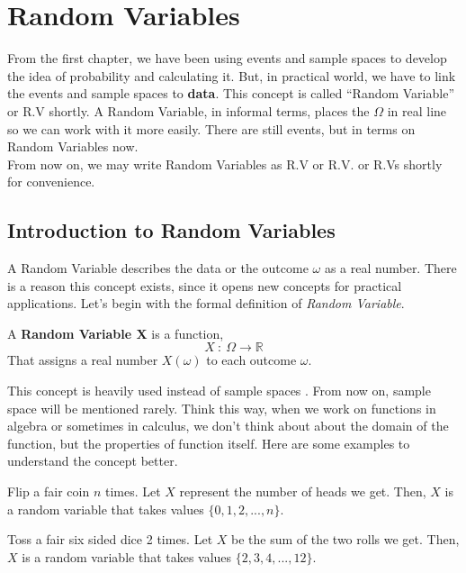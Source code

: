 \chapter{Random Variables}
From the first chapter, we have been using events and sample spaces to develop the idea of probability and calculating it. But, in practical world,  we have to link the events and sample spaces to \textbf{data}. This concept is called ``Random Variable'' or R.V shortly.
A Random Variable, in informal terms, places the $\Omega$ in real line so we can work with it more easily. There are still events, but in terms on Random Variables now.
\\From now on, we may write Random Variables as R.V or R.V. or R.Vs shortly for convenience.



\section{Introduction to Random Variables}
A Random Variable describes the data or the outcome $\omega$ as a real number. There is a reason this concept exists, since it opens new concepts for practical applications.
\newline
Let's begin with the formal definition of \textit{ Random Variable}.

\begin{definition}
    A \textbf{Random Variable X} is a function,
    $$ X \ : \ \Omega \rightarrow \mathbb{R}$$
    That assigns a real number $X(\omega)$ to each outcome $\omega$.
\end{definition}

This concept is heavily used instead of sample spaces . From now on, sample space will be mentioned rarely. Think this way, when we work on functions in algebra or sometimes in calculus, we don't think about about the domain of the function, but the properties of function itself.
Here are some examples to understand the concept better.

\begin{example}
    Flip a fair coin $n$ times. Let $X$ represent the number of heads we get. Then, $X$ is a random variable that takes values $\{0,1,2,...,n\}$.
\end{example}

\begin{example}
    Toss a fair six sided dice 2 times. Let $X$ be the sum of the two rolls we get. Then, $X$ is a random variable that takes values $\{2,3,4,...,12\}$.
\end{example}

